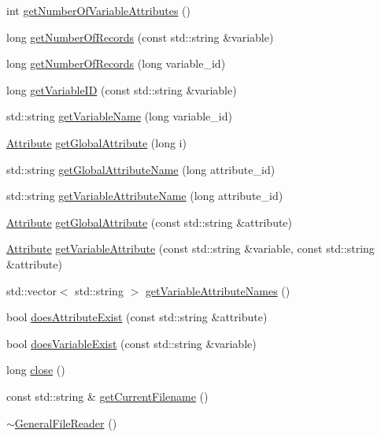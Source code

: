 \begin{DoxyCompactItemize}
\item 
int \hyperlink{classccmc_1_1_general_file_reader_a26826f6d17d297b4d4891c91ecf255af}{get\-Number\-Of\-Variable\-Attributes} ()
\item 
long \hyperlink{classccmc_1_1_general_file_reader_abd0a8c94efea9fc7f9ac3b1c1d5fe9d2}{get\-Number\-Of\-Records} (const std\-::string \&variable)
\item 
long \hyperlink{classccmc_1_1_general_file_reader_af720e4662deb1be6209cb5d2c2e9ff20}{get\-Number\-Of\-Records} (long variable\-\_\-id)
\item 
long \hyperlink{classccmc_1_1_general_file_reader_a6cc488b707602f3b4438408826d3df02}{get\-Variable\-I\-D} (const std\-::string \&variable)
\item 
std\-::string \hyperlink{classccmc_1_1_general_file_reader_a24a28efa48973345d705d9e379cacc12}{get\-Variable\-Name} (long variable\-\_\-id)
\item 
\hyperlink{classccmc_1_1_attribute}{Attribute} \hyperlink{classccmc_1_1_general_file_reader_a45b01633354be559eed7cc6c854573c1}{get\-Global\-Attribute} (long i)
\item 
std\-::string \hyperlink{classccmc_1_1_general_file_reader_ab7fd42f992e99ec28860e49cd8396126}{get\-Global\-Attribute\-Name} (long attribute\-\_\-id)
\item 
std\-::string \hyperlink{classccmc_1_1_general_file_reader_a37342bc8999fdda1ee4ad52a62af650c}{get\-Variable\-Attribute\-Name} (long attribute\-\_\-id)
\item 
\hyperlink{classccmc_1_1_attribute}{Attribute} \hyperlink{classccmc_1_1_general_file_reader_abd1d4ce80397965b7d4ddbc9435c0bdd}{get\-Global\-Attribute} (const std\-::string \&attribute)
\item 
\hyperlink{classccmc_1_1_attribute}{Attribute} \hyperlink{classccmc_1_1_general_file_reader_a8a683e97f0affa385344a0da5b7afd1a}{get\-Variable\-Attribute} (const std\-::string \&variable, const std\-::string \&attribute)
\item 
std\-::vector$<$ std\-::string $>$ \hyperlink{classccmc_1_1_general_file_reader_a6e3e6cdd1bab8ee979c0f13276291331}{get\-Variable\-Attribute\-Names} ()
\item 
bool \hyperlink{classccmc_1_1_general_file_reader_a2038ca818d84aec04ecf2b6fdd8710ce}{does\-Attribute\-Exist} (const std\-::string \&attribute)
\item 
bool \hyperlink{classccmc_1_1_general_file_reader_a7752dcc4d653d0d325cbe5ce1b9a7ebe}{does\-Variable\-Exist} (const std\-::string \&variable)
\item 
long \hyperlink{classccmc_1_1_general_file_reader_a4d56da3556557ae38485abdcdeacc90e}{close} ()
\item 
const std\-::string \& \hyperlink{classccmc_1_1_general_file_reader_aa18066d5c371290ddee53de8e24e04a7}{get\-Current\-Filename} ()
\item 
\hyperlink{classccmc_1_1_general_file_reader_a7f1fe93414b533d8149b2c62d4d0b49d}{$\sim$\-General\-File\-Reader} ()
\end{DoxyCompactItemize}
